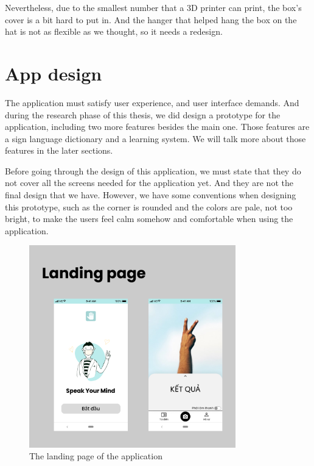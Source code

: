 Nevertheless, due to the smallest number that a 3D printer can print, the box's cover is a bit hard to put in. And the hanger that helped hang the box on the hat is not as flexible as we thought, so it needs a redesign.

\section{App design}

The application must satisfy user experience, and user interface demands. And during the research phase of this thesis, we did design a prototype for the application, including two more features besides the main one. Those features are a sign language dictionary and a learning system. We will talk more about those features in the later sections.

Before going through the design of this application, we must state that they do not cover all the screens needed for the application yet. And they are not the final design that we have. However, we have some conventions when designing this prototype, such as the corner is rounded and the colors are pale, not too bright, to make the users feel calm somehow and comfortable when using the application.

\begin{figure}[H]
	\centering
	\includegraphics[width=0.8\textwidth]{img/Chap5/Landing_page.png}
	\caption{The landing page of the application}
\end{figure}

